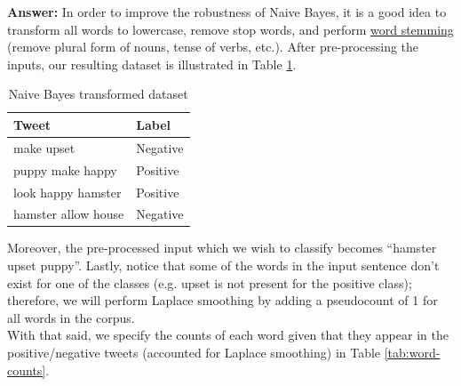 \documentclass{article}
\newenvironment{QandA}{\begin{enumerate}[label=\arabic*.]}{\end{enumerate}}
\newenvironment{InnerQandA}{\begin{enumerate}[label=\roman*.]}{\end{enumerate}}
\newenvironment{answer}{\par\normalfont \textbf{Answer:}}{}
\begin{document}
\begin{QandA}
\begin{InnerQandA}
        \begin{answer}
        In order to improve the robustness of Naive Bayes, it is a good idea to transform all words to lowercase, remove stop words, and perform \href{https://www.geeksforgeeks.org/python-stemming-words-with-nltk/}{word stemming} (remove plural form of nouns, tense of verbs, etc.). After pre-processing the inputs, our resulting dataset is illustrated in Table \ref{tab:naive-bayes-transformed-dataset}. 
        
        \begin{table}[h!]
        \centering
        \begin{tabular}{|l|l|}
        \hline
        \textbf{Tweet}         & \textbf{Label} \\ \hline
        make upset             & Negative       \\ \hline
        puppy make happy       & Positive       \\ \hline
        look happy hamster     & Positive       \\ \hline
        hamster allow house & Negative       \\ \hline
        \end{tabular}
        \caption{Naive Bayes transformed dataset}
        \label{tab:naive-bayes-transformed-dataset}
        \end{table}
        
        Moreover, the pre-processed input which we wish to classify becomes ``hamster upset puppy''. Lastly, notice that some of the words in the input sentence don't exist for one of the classes (e.g. upset is not present for the positive class); therefore, we will perform Laplace smoothing by adding a pseudocount of 1 for all words in the corpus. \\
        With that said, we specify the counts of each word given that they appear in the positive/negative tweets (accounted for Laplace smoothing) in Table \ref{tab:word-counts}.\\


\end{answer}
\end{InnerQandA}
\end{QandA}
\end{document}
